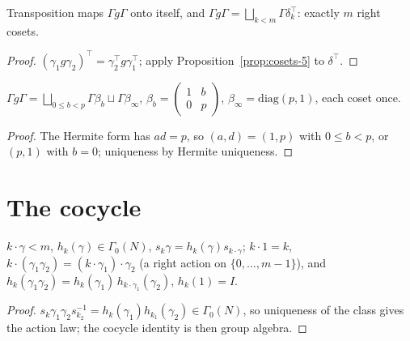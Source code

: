 \begin{proposition}\label{prop:cosets-2}
  \leanok
  Transposition maps $\Gamma g\Gamma$ onto itself, and $\Gamma g\Gamma=\bigsqcup_{k<m}\Gamma\delta_k^{\top}$: exactly $m$ right
  cosets.
\end{proposition}
\begin{proof}
  \leanok
  $(\gamma_1g\gamma_2)^\top=\gamma_2^\top g\gamma_1^\top$; apply Proposition~\ref{prop:cosets-5} to $\delta^\top$.
\end{proof}

\begin{proposition}[$\nu=1$: the explicit right cosets]\label{prop:cosets-1nu1}
  \leanok
  $\Gamma g\Gamma=\bigsqcup_{0\le b<p}\Gamma\beta_b\sqcup\Gamma\beta_\infty$, $\beta_b=\left(\begin{smallmatrix}1&b\\0&p\end{smallmatrix}\right)$,
  $\beta_\infty=\mathrm{diag}(p,1)$, each coset once.
\end{proposition}
\begin{proof}
  \leanok
  The Hermite form has $ad=p$, so $(a,d)=(1,p)$ with $0\le b<p$, or $(p,1)$ with $b=0$; uniqueness by Hermite uniqueness.
\end{proof}

\section{The cocycle}

\begin{lemma}\label{lem:cocycle}
  \leanok
  $k\cdot\gamma<m$, $h_k(\gamma)\in\Gamma_0(N)$, $s_k\gamma=h_k(\gamma)s_{k\cdot\gamma}$; $k\cdot1=k$,
  $k\cdot(\gamma_1\gamma_2)=(k\cdot\gamma_1)\cdot\gamma_2$ (a right action on $\{0,\dots,m-1\}$), and
  $h_k(\gamma_1\gamma_2)=h_k(\gamma_1)\,h_{k\cdot\gamma_1}(\gamma_2)$, $h_k(1)=I$.
\end{lemma}
\begin{proof}
  \leanok
  $s_k\gamma_1\gamma_2s_{k_2}^{-1}=h_k(\gamma_1)h_{k_1}(\gamma_2)\in\Gamma_0(N)$, so uniqueness of the class gives the action
  law; the cocycle identity is then group algebra.
\end{proof}

